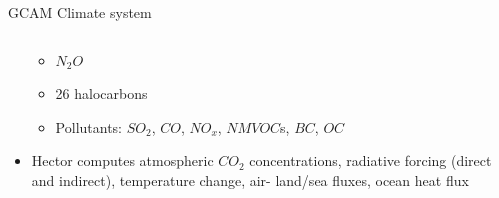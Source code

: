 \begin{frame}{GCAM Climate system}
\begin{columns}[T]
\begin{column}{0.48\textwidth}
\begin{itemize}
\begin{multicols}{2}
\begin{itemize}
                        \item $N_2O$
                        \item 26 halocarbons
                        \item Pollutants: $SO_2$, $CO$, $NO_x$, $NMVOC$s, $BC$, $OC$                    
                    \end{itemize}
                \end{multicols}
                \item Hector computes atmospheric $CO_2$ concentrations, radiative forcing (direct and indirect), temperature change, air- land/sea fluxes, ocean heat flux
            \end{itemize}
        \end{column}
    \end{columns}
\end{frame}
    